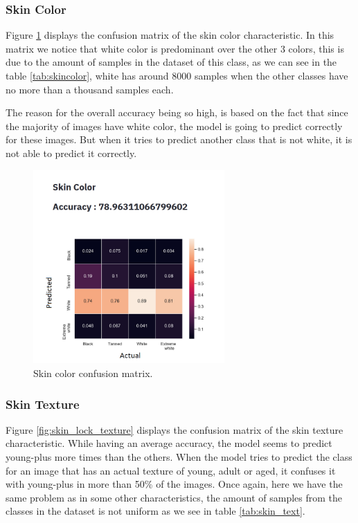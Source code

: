 \documentclass[12pt,a4paper,oneside]{memoir}
\begin{document}
\subsubsection{Skin Color}
Figure \ref{fig:skin_lock_color} displays the confusion matrix of the skin color characteristic. In this matrix we notice that white color is predominant over the other 3 colors, this is due to the amount of samples in the dataset of this class, as we can see in the table \ref{tab:skincolor}, white has around 8000 samples when the other classes have no more than a thousand samples each. 


\par

The reason for the overall accuracy being so high, is based on the fact that since the majority of images have white color, the model is going to predict correctly for these images. But when it tries to predict another class that is not white, it is not able to predict it correctly.
 
\begin{figure}[H]
\centering
\includegraphics[width=0.65\textwidth]{images/skin_lock_color.png}
\caption{Skin color confusion matrix.}
\centering
\label{fig:skin_lock_color}
\end{figure}


\subsubsection{Skin Texture}
Figure \ref{fig:skin_lock_texture} displays the confusion matrix of the skin texture characteristic. While having an average accuracy, the model seems to predict young-plus more times than the others. When the model tries to predict the class for an image that has an actual texture of young, adult or aged, it confuses it with young-plus in more than 50\% of the images. Once again, here we have the same problem as in some other characteristics, the amount of samples from the classes in the dataset is not uniform as we see in table \ref{tab:skin_text}.
\end{document}
